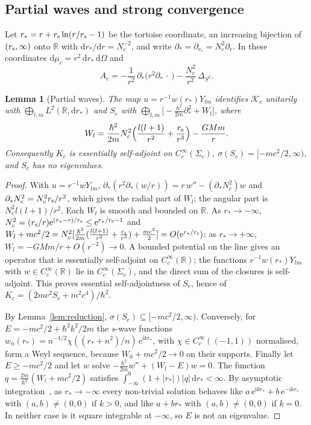 \documentclass[%
 aip,
 jmp,
 amsmath,amssymb,
 reprint, onecolumn
]{revtex4-1}
\newtheorem{alemma}{Lemma}
\theoremstyle{definition}
\theoremstyle{remark}
\newcommand{\R}{\mathbb{R}}
\newcommand{\K}{\mathcal{K}}
\newcommand{\rmd}{\mathrm{d}}
\newcommand{\rmi}{\mathrm{i}}
\newcommand{\rme}{\mathrm{e}}
\begin{document}
\subsection{Partial waves and strong convergence}\label{app:strong}

Let $r_*=r+r_{\rm s}\ln(r/r_{\rm s}-1)$ be the tortoise coordinate, an
increasing bijection of $(r_{\rm s},\infty)$ onto $\R$ with
$\rmd r_*/\rmd r=N_c^{-2}$, and write $\partial_*=\partial_{r_*}=N_c^2
\partial_r$. In these coordinates $\rmd\mu_c=r^2\,\rmd r_*\,\rmd\Omega$
and
\begin{equation}\label{eq:Ac-tortoise}
A_c=-\frac{1}{r^2}\,\partial_*\bigl(r^2\partial_*\,\cdot\,\bigr)-
\frac{N_c^2}{r^2}\,\Delta_{S^2}.
\end{equation}

\begin{alemma}[Partial waves]\label{lem:partial-waves}
The map $u=r^{-1}w(r_*)Y_{lm}$ identifies $\K_c$ unitarily with
$\bigoplus_{l,m}L^2(\R,\rmd r_*)$ and $S_c$ with $\bigoplus_{l,m}
\bigl[-\frac{\hbar^2}{2m}\partial_*^2+W_l\bigr]$, where
\[
W_l=\frac{\hbar^2}{2m}N_c^2\Bigl(\frac{l(l+1)}{r^2}+
\frac{r_{\rm s}}{r^3}\Bigr)-\frac{GMm}{r}.
\]
Consequently $K_c$ is essentially self-adjoint on
$C_c^\infty(\Sigma_c)$, $\sigma(S_c)=[-mc^2/2,\infty)$, and $S_c$ has no
eigenvalues.
\end{alemma}

\begin{proof}
With $u=r^{-1}wY_{lm}$, $\partial_*(r^2\partial_*(w/r))=r\,w''-
(\partial_*N_c^2)w$ and $\partial_*N_c^2=N_c^2r_{\rm s}/r^2$, which gives
the radial part of $W_l$; the angular part is
$N_c^2l(l+1)/r^2$. Each $W_l$ is smooth and bounded on $\R$. As
$r_*\to-\infty$, $N_c^2=(r_{\rm s}/r)\rme^{(r_*-r)/r_{\rm s}}\leq
\rme^{r_*/r_{\rm s}-1}$ and $W_l+mc^2/2=N_c^2[\frac{\hbar^2}{2m}(\frac{l(l+1)}
{r^2}+\frac{r_{\rm s}}{r^3})+\frac{mc^2}2]=O(\rme^{r_*/r_{\rm s}})$; as
$r_*\to+\infty$, $W_l=-GMm/r+O(r^{-2})\to0$. A bounded potential on the
line gives an operator that is essentially self-adjoint on
$C_c^\infty(\R)$; the functions $r^{-1}w(r_*)Y_{lm}$ with $w\in
C_c^\infty(\R)$ lie in $C_c^\infty(\Sigma_c)$, and the direct sum of the
closures is self-adjoint. This proves essential self-adjointness of
$S_c$, hence of $K_c=(2mc^2S_c+m^2c^4)/\hbar^2$.

By Lemma~\ref{lem:reduction}, $\sigma(S_c)\subseteq[-mc^2/2,\infty)$.
Conversely, for $E=-mc^2/2+\hbar^2k^2/2m$ the $s$-wave functions
$w_n(r_*)=n^{-1/2}\chi((r_*+n^2)/n)\,\rme^{\rmi kr_*}$, with $\chi\in
C_c^\infty((-1,1))$ normalised, form a Weyl sequence, because
$W_0+mc^2/2\to0$ on their supports. Finally let $E\geq-mc^2/2$ and let
$w$ solve $-\frac{\hbar^2}{2m}w''+(W_l-E)w=0$. The function $q=
\frac{2m}{\hbar^2}(W_l+mc^2/2)$ satisfies $\int_{-\infty}^0(1+|r_*|)|q|\,
\rmd r_*<\infty$. By asymptotic integration~\cite{Weidmann1987}, as
$r_*\to-\infty$ every non-trivial solution behaves like
$a\,\rme^{\rmi kr_*}+b\,\rme^{-\rmi kr_*}$ with $(a,b)\neq(0,0)$ if $k>0$,
and like $a+br_*$ with $(a,b)\neq(0,0)$ if $k=0$. In neither case is it
square integrable at $-\infty$, so $E$ is not an eigenvalue.
\end{proof}
\end{document}
